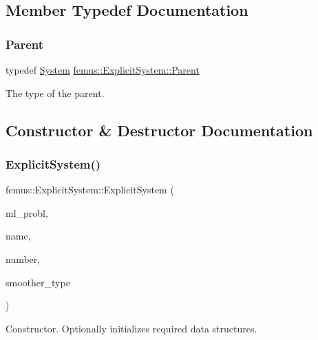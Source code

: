 \subsection{Member Typedef Documentation}
\mbox{\label{classfemus_1_1_explicit_system_ad338cb1d97f154cadb9e630ada84f447}} 
\subsubsection{\texorpdfstring{Parent}{Parent}}
{\footnotesize\ttfamily typedef \mbox{\hyperlink{classfemus_1_1_system}{System}} \mbox{\hyperlink{classfemus_1_1_explicit_system_ad338cb1d97f154cadb9e630ada84f447}{femus\+::\+Explicit\+System\+::\+Parent}}}

The type of the parent. 

\subsection{Constructor \& Destructor Documentation}
\mbox{\label{classfemus_1_1_explicit_system_a8d4304329b95b7c570c846fd919156a0}} 
\subsubsection{\texorpdfstring{Explicit\+System()}{ExplicitSystem()}}
{\footnotesize\ttfamily femus\+::\+Explicit\+System\+::\+Explicit\+System (\begin{DoxyParamCaption}\item[{\mbox{\hyperlink{classfemus_1_1_multi_level_problem}{Multi\+Level\+Problem}} \&}]{ml\+\_\+probl,  }\item[{const std\+::string \&}]{name,  }\item[{const unsigned int}]{number,  }\item[{const \mbox{\hyperlink{_mg_smoother_enum_8hpp_a4d11c2ff93e2f0f440c879a9c40cda71}{Mg\+Smoother}} \&}]{smoother\+\_\+type }\end{DoxyParamCaption})}

Constructor. Optionally initializes required data structures. \mbox{\label{classfemus_1_1_explicit_system_aa043bf47db592a14016c84f5adaaa4a5}} 
